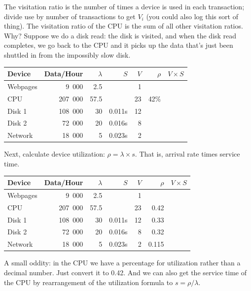 \documentclass[a4paper]{report}
\begin{document}
The visitation ratio is the number of times a device is used in each transaction; divide use by number of transactions to get $V_{i}$ (you could also log this sort of thing). The visitation ratio of the CPU is the sum of all other visitation ratios. Why? Suppose we do a disk read: the disk is visited, and when the disk read completes, we go back to the CPU and it picks up the data that's just been shuttled in from the impossibly slow disk.

\begin{center}
\begin{tabular}{l|r|r|r|r|r|r} 
	\textbf{Device} & \textbf{Data/Hour} & \textbf{$\lambda$} & \textbf{$S$} & \textbf{$V$} & \textbf{$\rho$} & \textbf{$V \times S$} \\ \hline
	Webpages & 9~000 & 2.5 & & 1 & & \\ \hline
	CPU & 207~000 & 57.5 &  & 23 & 42\% & \\ \hline
	Disk 1 & 108~000 & 30 & 0.011s  & 12& &\\ \hline
	Disk 2 & 72~000 & 20 & 0.016s & 8 & &\\ \hline
	Network & 18~000 & 5 & 0.023s & 2 & &
\end{tabular}
\end{center}

Next, calculate device utilization: $\rho = \lambda \times s$. That is, arrival rate times service time.

\begin{center}
\begin{tabular}{l|r|r|r|r|r|r} 
	\textbf{Device} & \textbf{Data/Hour} & \textbf{$\lambda$} & \textbf{$S$} & \textbf{$V$} & \textbf{$\rho$} & \textbf{$V \times S$} \\ \hline
	Webpages & 9~000 & 2.5 & & 1 & & \\ \hline
	CPU & 207~000 & 57.5 &  & 23 & 0.42 & \\ \hline
	Disk 1 & 108~000 & 30 & 0.011s  & 12& 0.33 &\\ \hline
	Disk 2 & 72~000 & 20 & 0.016s & 8 & 0.32 &\\ \hline
	Network & 18~000 & 5 & 0.023s & 2 & 0.115 &
\end{tabular}
\end{center}

A small oddity: in the CPU we have a percentage for utilization rather than a decimal number. Just convert it to 0.42. And we can also get the service time of the CPU by rearrangement of the utilization formula to $s = \rho / \lambda$.
\end{document}
